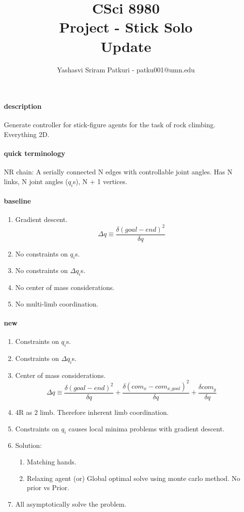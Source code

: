 \documentclass[12pt]{article}
\title{CSci 8980\\Project - Stick Solo\\Update}
\author{
Yashasvi Sriram Patkuri - patku001@umn.edu\\
}
\begin{document}
\maketitle
\pagebreak

\paragraph{description}
Generate controller for stick-figure agents for the task of rock climbing. Everything 2D.

\paragraph{quick terminology}
NR chain: A serially connected N edges with controllable joint angles.
Has N links, N joint angles ($q_i$s), N + 1 vertices.

\paragraph{baseline}
\begin{enumerate}[nolistsep]
    \item Gradient descent.
        \[
            \Delta q \equiv \frac{\delta (goal - end)^2}{\delta q}
        \]
    \item No constraints on $q_i$s.
    \item No constraints on $\Delta q_i$s.
    \item No center of mass considerations.
    \item No multi-limb coordination.
\end{enumerate}

\paragraph{new}
\begin{enumerate}[nolistsep]
    \item Constraints on $q_i$s.
    \item Constraints on $\Delta q_i$s.
    \item Center of mass considerations.
        \[
            \Delta q \equiv
            \frac{\delta (goal - end)^2}{\delta q}
            +
            \frac{\delta (com_x - com_{x\_goal})^2}{\delta q}
            +
            \frac{\delta com_y}{\delta q}
        \]
    \item 4R as 2 limb. Therefore inherent limb coordination.
    \item Constraints on $q_i$ causes local minima problems with gradient descent.
    \item Solution:
        \begin{enumerate}[nolistsep]
            \item Matching hands.
            \item Relaxing agent (or) Global optimal solve using monte carlo method. No prior vs Prior.
        \end{enumerate}
    \item All asymptotically solve the problem.
\end{enumerate}
\end{document}

